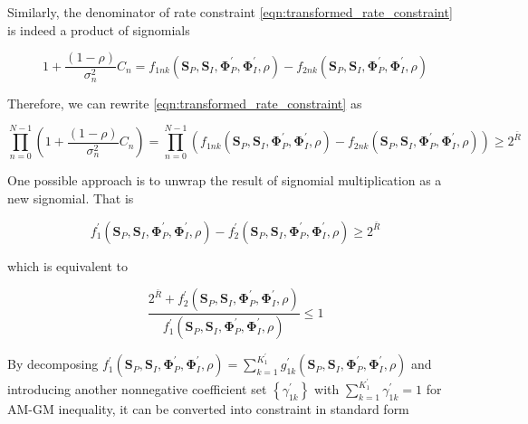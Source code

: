 Similarly, the denominator of rate constraint \ref{eqn:transformed_rate_constraint} is indeed a product of signomials

\begin{equation}\label{eqn:mo_rate_signomial}
  1 + \frac{{(1 - \rho )}}{{\sigma _n^2}}{C_n} = {f_{1nk}}\left( {{{\mathbf{S}}_P},{{\mathbf{S}}_I},{\mathbf{\Phi }}_P^\prime ,{\mathbf{\Phi }}_I^\prime ,\rho } \right) - {f_{2nk}}\left( {{{\mathbf{S}}_P},{{\mathbf{S}}_I},{\mathbf{\Phi }}_P^\prime ,{\mathbf{\Phi }}_I^\prime ,\rho } \right)
\end{equation}

Therefore, we can rewrite \ref{eqn:transformed_rate_constraint} as

\begin{equation}\label{eqn:mo_rate_constraint_original}
  \prod\limits_{n = 0}^{N - 1} {\left( {1 + \frac{{(1 - \rho )}}{{\sigma _n^2}}{C_n}} \right)}  = \prod\limits_{n = 0}^{N - 1} {\left( {{f_{1nk}}\left( {{{\mathbf{S}}_P},{{\mathbf{S}}_I},{\mathbf{\Phi }}_P^\prime ,{\mathbf{\Phi }}_I^\prime ,\rho } \right) - {f_{2nk}}\left( {{{\mathbf{S}}_P},{{\mathbf{S}}_I},{\mathbf{\Phi }}_P^\prime ,{\mathbf{\Phi }}_I^\prime ,\rho } \right)} \right)}  \geqslant {2^{\bar R}}
\end{equation}

One possible approach is to unwrap the result of signomial multiplication as a new signomial. That is

\begin{equation}\label{eqn:mo_rate_constraint_unwrapped}
  f_1^\prime \left( {{{\mathbf{S}}_P},{{\mathbf{S}}_I},{\mathbf{\Phi }}_P^\prime ,{\mathbf{\Phi }}_I^\prime ,\rho } \right) - f_2^\prime \left( {{{\mathbf{S}}_P},{{\mathbf{S}}_I},{\mathbf{\Phi }}_P^\prime ,{\mathbf{\Phi }}_I^\prime ,\rho } \right) \geqslant {2^{\bar R}}
\end{equation}

which is equivalent to

\begin{equation}\label{eqn:mo_rate_constraint_rewritten}
  \frac{{{2^{\bar R}} + f_2^\prime \left( {{{\mathbf{S}}_P},{{\mathbf{S}}_I},{\mathbf{\Phi }}_P^\prime ,{\mathbf{\Phi }}_I^\prime ,\rho } \right)}}{{f_1^\prime \left( {{{\mathbf{S}}_P},{{\mathbf{S}}_I},{\mathbf{\Phi }}_P^\prime ,{\mathbf{\Phi }}_I^\prime ,\rho } \right)}} \leqslant 1
\end{equation}

By decomposing $f_1^\prime \left( {{{\mathbf{S}}_P},{{\mathbf{S}}_I},{\mathbf{\Phi }}_P^\prime ,{\mathbf{\Phi }}_I^\prime ,\rho } \right) = \sum\limits_{k = 1}^{K_1^\prime } {g_{1k}^\prime \left( {{{\mathbf{S}}_P},{{\mathbf{S}}_I},{\mathbf{\Phi }}_P^\prime ,{\mathbf{\Phi }}_I^\prime ,\rho } \right)} $ and introducing another nonnegative coefficient set $\left\{ {\gamma _{1k}^\prime } \right\}$ with $\sum\nolimits_{k = 1}^{K_1^\prime } {\gamma _{1k}^\prime }  = 1$ for AM-GM inequality, it can be converted into constraint in standard form

